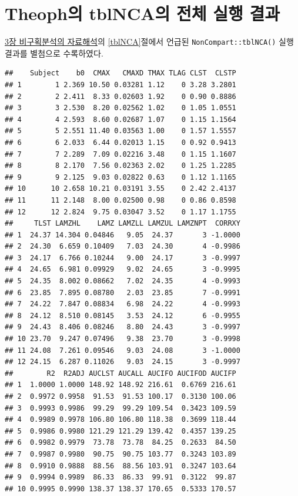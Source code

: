 \documentclass[
  11pt,
  krantz2, a4paper, twoside]{krantz}
\theoremstyle{definition}
\theoremstyle{definition}
\theoremstyle{definition}
\theoremstyle{definition}
\theoremstyle{remark}
\begin{document}
\chapter{Theoph의 tblNCA의 전체 실행 결과}\label{Theoph_tblNCA}

\hyperref[nca-analysis]{3장 비구획분석의 자료해석}의 \ref{tblNCA}절에서 언급된 \texttt{NonCompart::tblNCA()} 실행결과를 별첨으로 수록하였다.

\tiny

\begin{verbatim}
##    Subject    b0  CMAX   CMAXD TMAX TLAG CLST  CLSTP
## 1        1 2.369 10.50 0.03281 1.12    0 3.28 3.2801
## 2        2 2.411  8.33 0.02603 1.92    0 0.90 0.8886
## 3        3 2.530  8.20 0.02562 1.02    0 1.05 1.0551
## 4        4 2.593  8.60 0.02687 1.07    0 1.15 1.1564
## 5        5 2.551 11.40 0.03563 1.00    0 1.57 1.5557
## 6        6 2.033  6.44 0.02013 1.15    0 0.92 0.9413
## 7        7 2.289  7.09 0.02216 3.48    0 1.15 1.1607
## 8        8 2.170  7.56 0.02363 2.02    0 1.25 1.2285
## 9        9 2.125  9.03 0.02822 0.63    0 1.12 1.1165
## 10      10 2.658 10.21 0.03191 3.55    0 2.42 2.4137
## 11      11 2.148  8.00 0.02500 0.98    0 0.86 0.8598
## 12      12 2.824  9.75 0.03047 3.52    0 1.17 1.1755
##     TLST LAMZHL    LAMZ LAMZLL LAMZUL LAMZNPT  CORRXY
## 1  24.37 14.304 0.04846   9.05  24.37       3 -1.0000
## 2  24.30  6.659 0.10409   7.03  24.30       4 -0.9986
## 3  24.17  6.766 0.10244   9.00  24.17       3 -0.9997
## 4  24.65  6.981 0.09929   9.02  24.65       3 -0.9995
## 5  24.35  8.002 0.08662   7.02  24.35       4 -0.9993
## 6  23.85  7.895 0.08780   2.03  23.85       7 -0.9991
## 7  24.22  7.847 0.08834   6.98  24.22       4 -0.9993
## 8  24.12  8.510 0.08145   3.53  24.12       6 -0.9955
## 9  24.43  8.406 0.08246   8.80  24.43       3 -0.9997
## 10 23.70  9.247 0.07496   9.38  23.70       3 -0.9998
## 11 24.08  7.261 0.09546   9.03  24.08       3 -1.0000
## 12 24.15  6.287 0.11026   9.03  24.15       3 -0.9997
##        R2  R2ADJ AUCLST AUCALL AUCIFO AUCIFOD AUCIFP
## 1  1.0000 1.0000 148.92 148.92 216.61  0.6769 216.61
## 2  0.9972 0.9958  91.53  91.53 100.17  0.3130 100.06
## 3  0.9993 0.9986  99.29  99.29 109.54  0.3423 109.59
## 4  0.9989 0.9978 106.80 106.80 118.38  0.3699 118.44
## 5  0.9986 0.9980 121.29 121.29 139.42  0.4357 139.25
## 6  0.9982 0.9979  73.78  73.78  84.25  0.2633  84.50
## 7  0.9987 0.9980  90.75  90.75 103.77  0.3243 103.89
## 8  0.9910 0.9888  88.56  88.56 103.91  0.3247 103.64
## 9  0.9994 0.9989  86.33  86.33  99.91  0.3122  99.87
## 10 0.9995 0.9990 138.37 138.37 170.65  0.5333 170.57

\end{verbatim}
\end{document}
